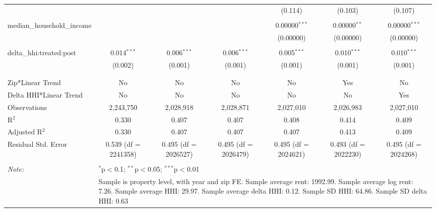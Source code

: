 \begin{table}[H]
{\begin{tabular}{@{\extracolsep{5pt}}lcccccc}
   &  &  &  & (0.114) & (0.103) & (0.107) \\  

   & & & & & & \\  

  median\_household\_income &  &  &  & 0.00000$^{***}$ & 0.00000$^{**}$ & 0.00000$^{***}$ \\  

   &  &  &  & (0.00000) & (0.00000) & (0.00000) \\  

   & & & & & & \\  

  delta\_hhi:treated:post & 0.014$^{***}$ & 0.006$^{***}$ & 0.006$^{***}$ & 0.005$^{***}$ & 0.010$^{***}$ & 0.010$^{***}$ \\  

   & (0.002) & (0.001) & (0.001) & (0.001) & (0.001) & (0.001) \\  

   & & & & & & \\  

 \hline \\[-1.8ex]  

 Zip*Linear Trend & No & No & No & No & Yes & No \\  

 Delta HHI*Linear Trend & No & No & No & No & No & Yes \\  

 Observations & 2,243,750 & 2,028,918 & 2,028,871 & 2,027,010 & 2,026,983 & 2,027,010 \\  

 R$^{2}$ & 0.330 & 0.407 & 0.407 & 0.408 & 0.414 & 0.409 \\  

 Adjusted R$^{2}$ & 0.330 & 0.407 & 0.407 & 0.407 & 0.413 & 0.409 \\  

 Residual Std. Error & 0.539 (df = 2241358) & 0.495 (df = 2026527) & 0.495 (df = 2026479) & 0.495 (df = 2024621) & 0.493 (df = 2022230) & 0.495 (df = 2024268) \\  

 \hline  

 \hline \\[-1.8ex]  

 \textit{Note:}  & \multicolumn{6}{l}{$^{*}$p$<$0.1; $^{**}$p$<$0.05; $^{***}$p$<$0.01} \\  

  & \multicolumn{6}{l}{Sample is property level, with year and zip FE. Sample average rent: 1992.99. Sample average log rent: 7.26. Sample average HHI: 29.97. Sample average delta HHI: 0.12. Sample SD HHI: 64.86. Sample SD delta HHI: 0.63} \\  

 \end{tabular}}  

 \end{table}  

